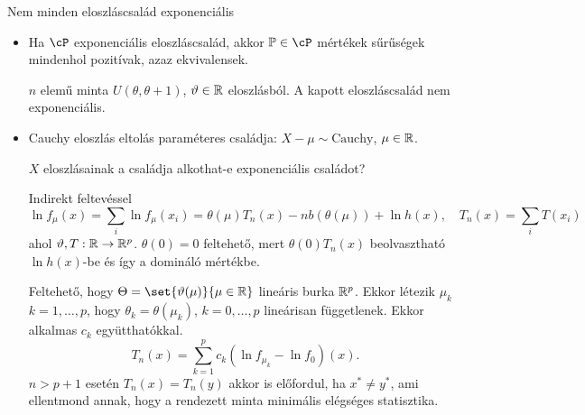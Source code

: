 \documentclass[aspectratio=169,notheorems,9pt,\option]{beamer}
\begin{document}
\begin{frame}{Nem minden eloszláscsalád exponenciális}
  \begin{itemize}
    \item Ha $\cP$ exponenciális eloszláscsalád, akkor $\P\in\cP$ mértékek sűrűségek mindenhol pozitívak, 
    azaz ekvivalensek.

    $n$ elemű minta $U(\theta,\theta+1)$, $\vartheta\in\mathbb{R}$ eloszlásból.
    A kapott eloszláscsalád nem exponenciális.
    \item Cauchy eloszlás eltolás paraméteres családja: $X-\mu\sim \text{Cauchy}$, $\mu\in\mathbb{R}$.
    
    $X$ eloszlásainak a családja alkothat-e exponenciális családot?

    Indirekt feltevéssel %
    \begin{displaymath}
      \ln f_\mu(x)=\sum_i \ln f_\mu(x_i)=\theta(\mu)T_n(x)-n b(\theta(\mu))+\ln h(x), \quad T_n(x)=\sum_i T(x_i) 
    \end{displaymath}
    ahol $\vartheta,T:\mathbb{R}\to\mathbb{R}^p$. $\theta(0)=0$ feltehető, mert $\theta(0)T_n(x)$ beolvasztható $\ln h(x)$-be 
    és így a domináló mértékbe.

    Feltehető, hogy $\Theta=\set{\theta(\mu)}{\mu\in\real}$ %
    lineáris burka $\mathbb{R}^p$. Ekkor létezik $\mu_k$ $k=1,\dots,p$, 
    hogy $\theta_k=\theta(\mu_k)$, $k=0,\dots,p$ lineárisan függetlenek. Ekkor alkalmas $c_k$ együtthatókkal.
    \begin{displaymath}
      T_n(x)=\sum_{k=1}^p c_k (\ln f_{\mu_k}-\ln f_0)(x).
    \end{displaymath}
    $n>p+1$ esetén $T_n(x)=T_n(y)$ akkor is előfordul, ha $x^*\neq y^*$, ami ellentmond annak, hogy a 
    rendezett minta minimális elégséges statisztika.

  \end{itemize}
  
\end{frame}
\end{document}
